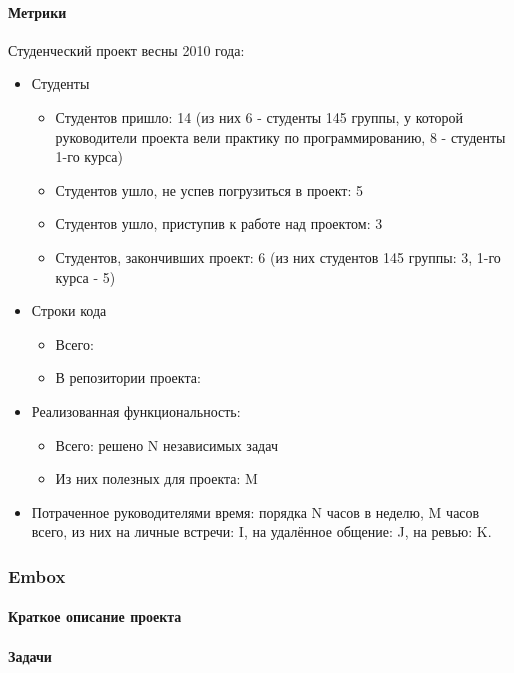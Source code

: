 \documentclass[a5paper]{article}
\begin{document}
\paragraph{Метрики}
Студенческий проект весны 2010 года:
\begin{itemize}
	\item Студенты
		\begin{itemize}
			\item Студентов пришло: 14 (из них 6 - студенты 145 группы, у которой руководители проекта вели практику по программированию, 8 - студенты 1-го курса)
			\item Студентов ушло, не успев погрузиться в проект: 5
			\item Студентов ушло, приступив к работе над проектом: 3
			\item Студентов, закончивших проект: 6 (из них студентов 145 группы: 3, 1-го курса - 5)
		\end{itemize}
	\item Строки кода
		\begin{itemize}
			\item Всего:
			\item В репозитории проекта:
		\end{itemize}
	\item Реализованная функциональность:
		\begin{itemize}
			\item Всего: решено N независимых задач 
			\item Из них полезных для проекта: M
		\end{itemize}
	\item Потраченное руководителями время: порядка N часов в неделю, M часов всего, из них на личные встречи: I, на удалённое общение: J, на ревью: K.
\end{itemize}




\subsubsection{Embox}

\paragraph{Краткое описание проекта}

\paragraph{Задачи}
\end{document}
